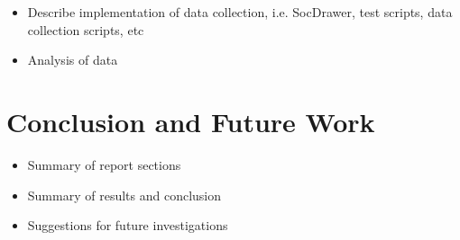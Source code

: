 \documentclass[12pt]{article}
\begin{document}
\begin{itemize}
\item Describe implementation of data collection, i.e. SocDrawer, test scripts, data collection scripts, etc
\item Analysis of data
\end{itemize}

\newpage

\section{Conclusion and Future Work}
\label{sec:Conclusion}


\begin{itemize}
\item Summary of report sections
\item Summary of results and conclusion
\item Suggestions for future investigations
\end{itemize}

\newpage



\nocite{*}
\end{document}
